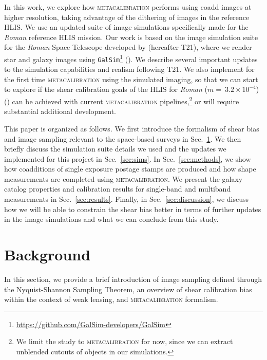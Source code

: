 \documentclass[fleqn,usenatbib]{mnras}
\begin{document}
In this work, we explore how \textsc{metacalibration} performs using coadd images at higher resolution, taking advantage of the dithering of images in the reference HLIS. We use an updated suite of image simulations specifically made for the \emph{Roman} reference HLIS mission. Our work is based on the image simulation suite for the \emph{Roman} Space Telescope developed by \cite{2021MNRAS.501.2044T} (hereafter T21), where we render star and galaxy images using \texttt{GalSim}\footnote{\url{ https://github.com/GalSim-developers/GalSim}} (\citealt{2015A&C....10..121R}). We describe several important updates to the simulation capabilities and realism following T21. We also implement for the first time \textsc{metacalibration} using the simulated imaging, so that we can start to explore if the shear calibration goals of the HLIS for \emph{Roman} ($m=~3.2\times10^{-4}$) (\citealt{2018arXiv180403628D}) can be achieved with current \textsc{metacalibration} pipelines,\footnote{We limit the study to \textsc{metacalibration} for now, since we can extract unblended cutouts of objects in our simulations.} or will require substantial additional development. \par


This paper is organized as follows. We first introduce the formalism of shear bias and image sampling relevant to the space-based surveys in Sec.~\ref{sec:background}. We then briefly discuss the simulation suite details we used and the updates we implemented for this project in Sec.~\ref{sec:sims}. In Sec.~\ref{sec:methods}, we show how coadditions of single exposure postage stamps are produced and how shape measurements are completed using \textsc{metacalibration}. We present the galaxy catalog properties and calibration results for single-band and multiband measurements in Sec.~\ref{sec:results}. Finally, in Sec.~\ref{sec:discussion}, we discuss how we will be able to constrain the shear bias better in terms of further updates in the image simulations and what we can conclude from this study. 

\section{Background}
\label{sec:background}
In this section, we provide a brief introduction of image sampling defined through the Nyquist-Shannon Sampling Theorem, an overview of shear calibration bias within the context of weak lensing, and \textsc{metacalibration} formalism.
\end{document}
